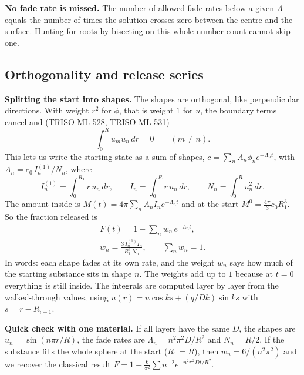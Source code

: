 \documentclass[11pt]{article}
\begin{document}
\textbf{No fade rate is missed.} The number of allowed fade rates below a given $\Lambda$ equals the number of times the solution crosses zero between the centre and the surface. Hunting for roots by bisecting on this whole-number count cannot skip one.

\subsection{Orthogonality and release series}
\textbf{Splitting the start into shapes.} The shapes are orthogonal, like perpendicular directions. With weight $r^2$ for $\phi$, that is weight $1$ for $u$, the boundary terms cancel and (TRISO-ML-528, TRISO-ML-531)
\[
\int_0^R u_mu_n\,dr=0\qquad(m\ne n).
\]
This lets us write the starting state as a sum of shapes, $c=\sum_nA_n\phi_ne^{-\Lambda_nt}$, with $A_n=c_0\,I^{(1)}_n/N_n$, where
\begin{equation}
I^{(1)}_n=\int_0^{R_1}r\,u_n\,dr,\qquad I_n=\int_0^{R}r\,u_n\,dr,\qquad N_n=\int_0^{R}u_n^2\,dr.
\tag{TRISO-DEL-020}
\end{equation}
The amount inside is $M(t)=4\pi\sum_nA_nI_ne^{-\Lambda_nt}$ and at the start $M^0=\tfrac{4\pi}{3}c_0R_1^3$. So the fraction released is
\begin{equation}
\begin{gathered}
F(t)=1-\sum_{n}w_n\,e^{-\Lambda_nt},\\
w_n=\frac{3\,I^{(1)}_nI_n}{R_1^3\,N_n},\qquad\sum_nw_n=1.
\end{gathered}
\tag{TRISO-DEL-021}
\end{equation}
In words: each shape fades at its own rate, and the weight $w_n$ says how much of the starting substance sits in shape $n$. The weights add up to $1$ because at $t=0$ everything is still inside. The integrals are computed layer by layer from the walked-through values, using $u(r)=u\cos ks+(q/Dk)\sin ks$ with $s=r-R_{i-1}$.

\textbf{Quick check with one material.} If all layers have the same $D$, the shapes are $u_n=\sin(n\pi r/R)$, the fade rates are $\Lambda_n=n^2\pi^2D/R^2$ and $N_n=R/2$. If the substance fills the whole sphere at the start ($R_1=R$), then $w_n=6/(n^2\pi^2)$ and we recover the classical result $F=1-\tfrac{6}{\pi^2}\sum n^{-2}e^{-n^2\pi^2Dt/R^2}$.
\end{document}
